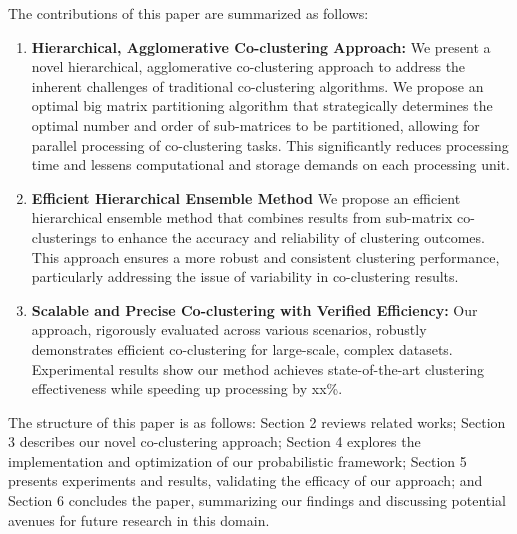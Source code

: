 The contributions of this paper are summarized as follows:
\begin{enumerate}
    \item \textbf{Hierarchical, Agglomerative Co-clustering Approach: }We present a novel hierarchical, agglomerative co-clustering approach to address the inherent challenges of traditional co-clustering algorithms. We propose an optimal big matrix partitioning algorithm that strategically determines the optimal number and order of sub-matrices to be partitioned, allowing for parallel processing of co-clustering tasks. This significantly reduces processing time and lessens computational and storage demands on each processing unit.
    \item \textbf{Efficient Hierarchical Ensemble Method} We propose an efficient hierarchical ensemble method that combines results from sub-matrix co-clusterings to enhance the accuracy and reliability of clustering outcomes. This approach ensures a more robust and consistent clustering performance, particularly addressing the issue of variability in co-clustering results.
    \item \textbf{Scalable and Precise Co-clustering with Verified Efficiency: } Our approach, rigorously evaluated across various scenarios, robustly demonstrates efficient co-clustering for large-scale, complex datasets. Experimental results show our method achieves state-of-the-art clustering effectiveness while speeding up processing by xx\%.
\end{enumerate}

The structure of this paper is as follows: Section 2 reviews related works; Section 3 describes our novel co-clustering approach; Section 4 explores the implementation and optimization of our probabilistic framework; Section 5 presents experiments and results, validating the efficacy of our approach; and Section 6 concludes the paper, summarizing our findings and discussing potential avenues for future research in this domain.
 